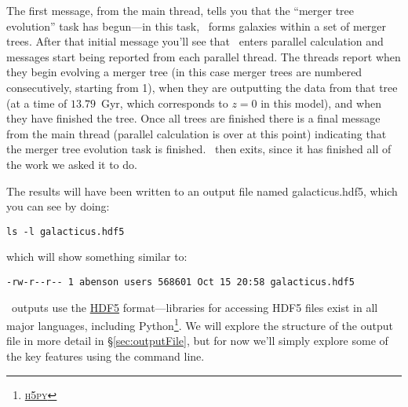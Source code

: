 The first message, from the main thread, tells you that the ``merger tree evolution'' task has begun---in this task, \glc\ forms galaxies within a set of merger trees. After that initial message you'll see that \glc\ enters parallel calculation and messages start being reported from each parallel thread. The threads report when they begin evolving a merger tree (in this case merger trees are numbered consecutively, starting from 1), when they are outputting the data from that tree (at a time of $13.79$~Gyr, which corresponds to $z=0$ in this model), and when they have finished the tree. Once all trees are finished there is a final message from the main thread (parallel calculation is over at this point) indicating that the merger tree evolution task is finished. \glc\ then exits, since it has finished all of the work we asked it to do.

The results will have been written to an output file named {\normalfont \ttfamily galacticus.hdf5}, which you can see by doing:
\begin{verbatim}
ls -l galacticus.hdf5
\end{verbatim}
which will show something similar to:
\begin{verbatim}
-rw-r--r-- 1 abenson users 568601 Oct 15 20:58 galacticus.hdf5
\end{verbatim}
\glc\ outputs use the \href{http://www.hdfgroup.org/HDF5/}{HDF5} format---libraries for accessing HDF5 files exist in all major languages, including Python\footnote{\href{https://www.h5py.org/}{{\normalfont \scshape h5py}}}. We will explore the structure of the output file in more detail in \S\ref{sec:outputFile}, but for now we'll simply explore some of the key features using the command line.

